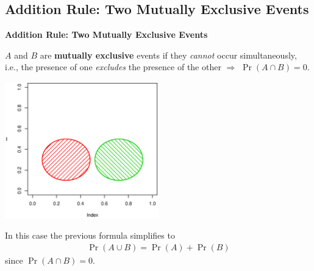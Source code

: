 \documentclass[compress]{beamer}        %
\makeatletter
\newcommand{\tcb}{\textcolor{beamer@blendedblue}}
\makeatother
\begin{document}
\subsection{Addition Rule: Two Mutually Exclusive Events}
\begin{frame}{\bf \tcb{Addition Rule: Two Mutually Exclusive Events}}

$A$ and $B$ are {\bf mutually exclusive} events if they \emph{cannot} occur simultaneously, i.e., the presence of one \emph{excludes} the presence of the other $\Rightarrow$ $\boxed{\Pr(A \cap B) = 0}$.\vspace{-0.5cm}

\begin{center}
\includegraphics[width=0.5\textwidth, trim = 3.3cm 3.8cm 2.3cm 6cm, clip]{AdditionRuleMutuallyExclusive}
\end{center}

In this case the previous formula simplifies to
\begin{align*}
\Pr(A \cup B) = \Pr(A) + \Pr(B)
\end{align*}
since $\Pr(A \cap B) = 0$.

\end{frame}
\end{document}
